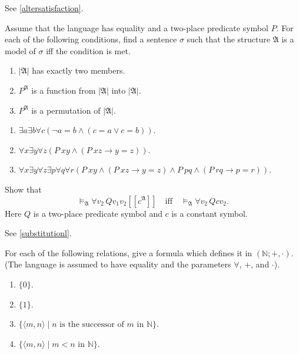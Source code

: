 See \ref{altersatisfaction}.

\setcounter{exercise}{8}

\begin{exercise}
  Assume that the language has equality and a two-place predicate symbol $P$. For each of the following conditions, find a sentence $\sigma$ such that the structure $\mathfrak{A}$ is a model of $\sigma$ iff the condition is met.
  \begin{enumerate}
    \item $|\mathfrak{A}|$ has exactly two members.
    \item $P^{\mathfrak{A}}$ is a function from $|\mathfrak{A}|$ into $|\mathfrak{A}|$.
    \item $P^{\mathfrak{A}}$ is a permutation of $|\mathfrak{A}|$.\qedhere
  \end{enumerate}
\end{exercise}

\begin{enumerate}
  \item $\exists a\exists b\forall c(\neg a=b\wedge(c=a\vee c=b))$.
  \item $\forall x\exists y\forall z(P\ xy\wedge(P\ xz\to y=z))$.
  \item $\forall x\exists y\forall z\exists p\forall q\forall r(P\ xy\wedge(P\ xz\to y=z)\wedge P\ pq\wedge(P\ rq\to p=r))$.
\end{enumerate}

\begin{exercise}
  Show that
  \[
    \models_{\mathfrak{A}} \forall v_2 \, Q v_1 v_2 [ [c^\mathfrak{A}] ] \quad \text{iff} \quad \models_{\mathfrak{A}} \forall v_2 \, Q c v_2.
  \]
  Here \( Q \) is a two-place predicate symbol and \( c \) is a constant symbol.
\end{exercise}

See \ref{substitutionl}.

\begin{exercise}
  For each of the following relations, give a formula which defines it in \((\mathbb{N}; +, \cdot)\). (The language is assumed to have equality and the parameters \(\forall\), \(+\), and \(\cdot\)).
  \begin{enumerate}
    \item \(\{0\}\).
    \item \(\{1\}\).
    \item \(\{ \langle m, n \rangle \mid n \text{ is the successor of } m \text{ in } \mathbb{N} \}\).
    \item \(\{ \langle m, n \rangle \mid m < n \text{ in } \mathbb{N} \}\).\qedhere
  \end{enumerate}
\end{exercise}

